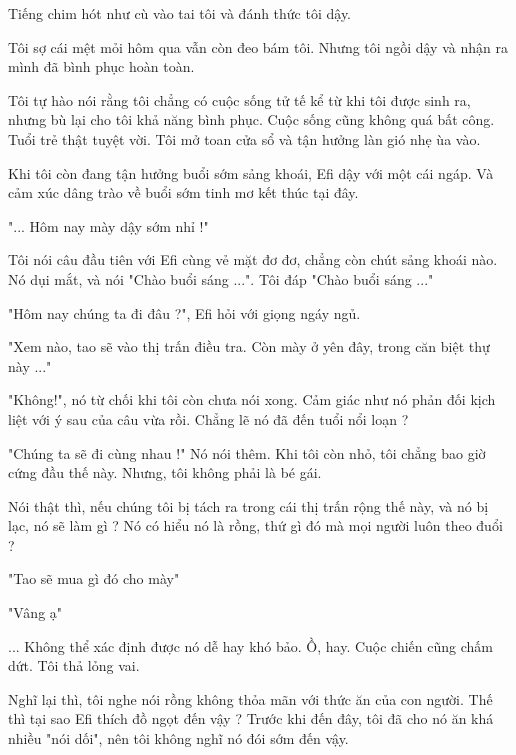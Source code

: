 
Tiếng chim hót như cù vào tai tôi và đánh thức tôi dậy.

Tôi sợ cái mệt mỏi hôm qua vẫn còn đeo bám tôi. Nhưng tôi ngồi dậy và nhận ra mình đã bình phục hoàn toàn.

Tôi tự hào nói rằng tôi chẳng có cuộc sống tử tế kể từ khi tôi được sinh ra, nhưng bù lại cho tôi khả năng bình phục. Cuộc sống cũng không quá bất công. Tuổi trẻ thật tuyệt vời. Tôi mở toan cửa sổ và tận hưởng làn gió nhẹ ùa vào. 

Khi tôi còn đang tận hưởng buổi sớm sảng khoái, Efi dậy với một cái ngáp. Và cảm xúc dâng trào về buổi sớm tinh mơ kết thúc tại đây.

"... Hôm nay mày dậy sớm nhỉ !"

Tôi nói câu đầu tiên với Efi cùng vẻ mặt đơ đơ, chẳng còn chút sảng khoái nào. Nó dụi mắt, và nói "Chào buổi sáng ...". Tôi đáp "Chào buổi sáng ..."

"Hôm nay chúng ta đi đâu ?", Efi hỏi với giọng ngáy ngủ.

"Xem nào, tao sẽ vào thị trấn điều tra. Còn mày ở yên đây, trong căn biệt thự này ..."

"Không!", nó từ chối khi tôi còn chưa nói xong. Cảm giác như nó phản đối kịch liệt với ý sau của câu vừa rồi. Chẳng lẽ nó đã đến tuổi nổi loạn ?

"Chúng ta sẽ đi cùng nhau !" Nó nói thêm. Khi tôi còn nhỏ, tôi chẳng bao giờ cứng đầu thế này. Nhưng, tôi không phải là bé gái.

Nói thật thì, nếu chúng tôi bị tách ra trong cái thị trấn rộng thế này, và nó bị lạc, nó sẽ làm gì ? Nó có hiểu nó là rồng, thứ gì đó mà mọi người luôn theo đuổi ?

"Tao sẽ mua gì đó cho mày"

"Vâng ạ"

... Không thể xác định được nó dễ hay khó bảo. Ồ, hay. Cuộc chiến cũng chấm dứt. Tôi thả lỏng vai.

Nghĩ lại thì, tôi nghe nói rồng không thỏa mãn với thức ăn của con người. Thế thì tại sao Efi thích đồ ngọt đến vậy ? Trước khi đến đây, tôi đã cho nó ăn khá nhiều "nói dối", nên tôi không nghĩ nó đói sớm đến vậy.

